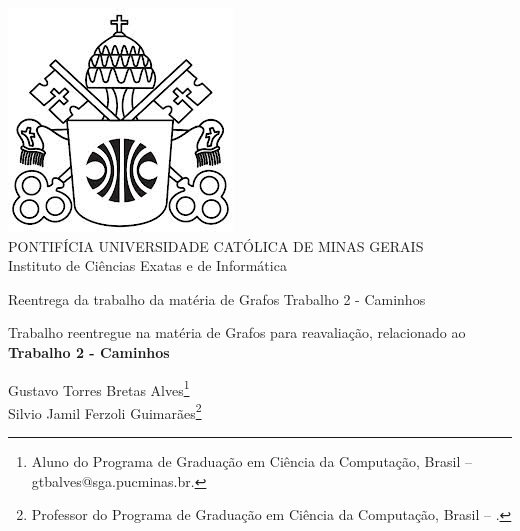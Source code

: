 \documentclass[a4paper,12pt,Times]{article}
\makeatletter
\newcommand{\monog}{Reentrega da trabalho da matéria de Grafos Trabalho 2 - Caminhos}
\newcommand{\monogES}{}
\newcommand{\origem}{Brasil }
\newcommand{\AutorA}{Gustavo Torres Bretas Alves}
\newcommand{\funcaoA}{}
\newcommand{\emailA}{gtbalves@sga.pucminas.br}
\newcommand{\cursA}{Aluno do Programa de Graduação em Ciência da Computação}
\newcommand{\AutorB}{Silvio Jamil Ferzoli Guimarães}
\newcommand{\funcaoB}{}
\newcommand{\emailB}{}
\newcommand{\cursB}{Professor do Programa de Graduação em Ciência da Computação}
\makeatother
\begin{document}

\begin{center}
\includegraphics[scale=0.2]{figuras/brasao.jpg} \\
PONTIFÍCIA UNIVERSIDADE CATÓLICA DE MINAS GERAIS \\
Instituto de Ciências Exatas e de Informática

 \vspace{0cm} {
 \singlespacing \Large{\monog {} \\ }
  \normalsize{\monogES}
 }

Trabalho reentregue na matéria de Grafos para reavaliação, relacionado ao \textbf{Trabalho 2 - Caminhos}
 
\end{center}
\vspace{1.0cm}
\begin{flushright}
\singlespacing 
\normalsize{\AutorA \footnote{\funcaoA \cursA, \origem -- \emailA . }} \\
\normalsize{\AutorB \footnote{\funcaoB \cursB, \origem -- \emailB . }} \\
\end{flushright}
\thispagestyle{empty}
\onehalfspace  %
\setlength{\parindent}{1.25cm}


\newpage
\tableofcontents
\newpage







%     
\end{document}
